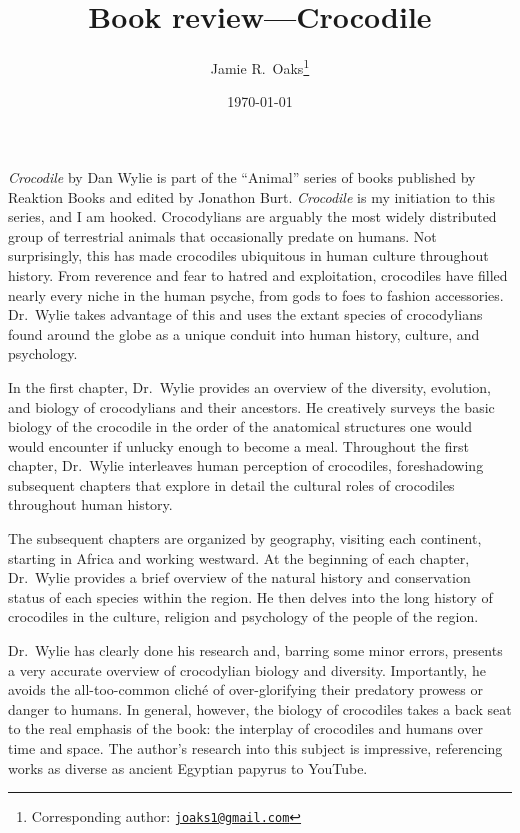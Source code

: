 \documentclass[letterpaper,12pt]{article}
\title{Book review---Crocodile}
\author[1]{Jamie R.\ Oaks\thanks{Corresponding author: \href{mailto:joaks1@gmail.com}{\tt joaks1@gmail.com}}}
\affil[1]{Department of Biology, University of Washington, Seattle, Washington 98195}
\date{\today}
\newcommand{\croc}{\emph{Crocodile}\xspace}
\begin{document}
\maketitle

\newpage
\doublespacing

\croc by Dan Wylie \citep{Wylie2013} is part of the ``Animal'' series of books
published by Reaktion Books and edited by Jonathon Burt.
\croc is my initiation to this series, and I am hooked.
Crocodylians are arguably the most widely distributed group of terrestrial
animals that occasionally predate on humans.
Not surprisingly, this has made crocodiles ubiquitous in human culture
throughout history.
From reverence and fear to hatred and exploitation, crocodiles have filled
nearly every niche in the human psyche, from gods to foes to fashion
accessories.
Dr.\ Wylie takes advantage of this and uses the extant species of crocodylians
found around the globe as a unique conduit into human history, culture, and
psychology.

In the first chapter, Dr.\ Wylie provides an overview of the diversity,
evolution, and biology of crocodylians and their ancestors.
He creatively surveys the basic biology of the crocodile in the order of the
anatomical structures one would would encounter if unlucky enough to become a
meal.
Throughout the first chapter, Dr.\ Wylie interleaves human perception of
crocodiles, foreshadowing subsequent chapters that explore in detail the
cultural roles of crocodiles throughout human history.

The subsequent chapters are organized by geography, visiting each continent,
starting in Africa and working westward.
At the beginning of each chapter, Dr.\ Wylie provides a brief overview of the
natural history and conservation status of each species within the region.
He then delves into the long history of crocodiles in the culture, religion and
psychology of the people of the region.

Dr.\ Wylie has clearly done his research and, barring some minor errors,
presents a very accurate overview of crocodylian biology and diversity.
Importantly, he avoids the all-too-common clich\'e of over-glorifying their
predatory prowess or danger to humans.
In general, however, the biology of crocodiles takes a back seat to the real
emphasis of the book: the interplay of crocodiles and humans over time and
space.
The author's research into this subject is impressive, referencing works as
diverse as ancient Egyptian papyrus to YouTube.
\end{document}

